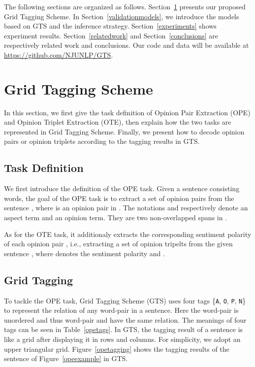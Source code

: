 \documentclass[11pt,a4paper]{article}
\begin{document}
The following sections are organized as follows. Section~\ref{gridtaggingscheme} presents our proposed Grid Tagging Scheme. In Section~\ref{validationmodels}, we introduce the models based on GTS and the inference strategy. Section~\ref{experiments} shows experiment results. Section~\ref{relatedwork} and Section~\ref{conclusions} are respectively related work and conclusions. Our code and data will be available at \url{https://github.com/NJUNLP/GTS}.


\section{Grid Tagging Scheme}
\label{gridtaggingscheme}
In this section, we first give the task definition of Opinion Pair Extraction (OPE) and Opinion Triplet Extraction (OTE), then explain how the two tasks are represented in Grid Tagging Scheme. Finally, we present how to decode opinion pairs or opinion triplets according to the tagging results in GTS.

\subsection{Task Definition}
We first introduce the definition of the OPE task. Given a sentence  consisting  words, the goal of the OPE task is to extract a set of opinion pairs  from the sentence , where  is an opinion pair in . The notations  and  respectively denote an aspect term and an opinion term. They are two non-overlapped spans in .

As for the OTE task, it additionaly extracts the corresponding sentiment polarity of each opinion pair , i.e., extracting a set of opinion tripelts  from the given sentence , where  denotes the sentiment polarity and .

\subsection{Grid Tagging}
\label{gridtagging}

To tackle the OPE task, Grid Tagging Scheme (GTS) uses four tags \{\texttt{A}, \texttt{O}, \texttt{P}, \texttt{N}\} to represent the relation of any word-pair  in a sentence. Here the word-pair  is unordered and thus word-pair  and  have the same relation. The meanings of four tags can be seen in Table~\ref{opetags}. In GTS, the tagging result of a sentence is like a grid after displaying it in rows and columns. For simplicity, we adopt an upper triangular grid. Figure~\ref{opetagging} shows the tagging results of the sentence of Figure~\ref{opeexample} in GTS.
\end{document}
